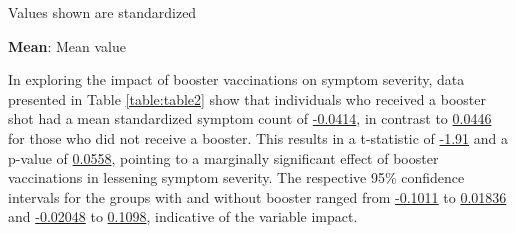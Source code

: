 \documentclass[11pt]{article}
\begin{document}
\begin{table}[h]
\caption{\protect\hyperlink{file-table-0-pkl}{Descriptive statistics of Age stratified by Sex and Immunity Group}}
\label{table:table0}
\begin{threeparttable}
\renewcommand{\TPTminimum}{\linewidth}
\begin{tablenotes}
\footnotesize
\item Values shown are standardized
\item \textbf{Mean}: Mean value
\end{tablenotes}
\end{threeparttable}
\end{table}

In exploring the impact of booster vaccinations on symptom severity, data presented in Table \ref{table:table2} show that individuals who received a booster shot had a mean standardized symptom count of \hyperlink{B1a}{-0.0414}, in contrast to \hyperlink{B2a}{0.0446} for those who did not receive a booster. This results in a t-statistic of \hyperlink{B1b}{-1.91} and a p-value of \hyperlink{B1c}{0.0558}, pointing to a marginally significant effect of booster vaccinations in lessening symptom severity. The respective 95\% confidence intervals for the groups with and without booster ranged from \hyperlink{B1d}{-0.1011} to \hyperlink{B1e}{0.01836} and \hyperlink{B2d}{-0.02048} to \hyperlink{B2e}{0.1098}, indicative of the variable impact.
\end{document}
